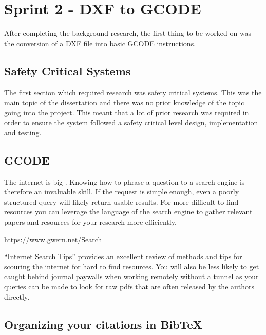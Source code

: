 \chapter{Sprint 2 - DXF to GCODE}
	\label{chap:background}
		
	After completing the background research, the first thing to be worked on was the conversion of a DXF file into basic GCODE instructions.

	\section{Safety Critical Systems}
		The first section which required research was safety critical systems. This was the main topic of the dissertation and there was no prior knowledge of the topic going into the project. This meant that a lot of prior research was required in order to ensure the system followed a safety critical level design, implementation and testing.

	\section{GCODE}
		\label{sec:google_fu}
		The internet is big \cite{sizeofinternet}. Knowing how to phrase a question to a search engine is therefore an invaluable skill. If the request is simple enough, even a poorly structured query will likely return usable results. For more difficult to find resources you can leverage the language of the search engine to gather relevant papers and resources for your research more efficiently. 
		
		\begin{center}
		{\small \url{https://www.gwern.net/Search}}
		\end{center}
		
		``Internet Search Tips'' \cite{gwern} provides an excellent review of methods and tips for scouring the internet for hard to find resources. You will also be less likely to get caught behind journal paywalls when working remotely without a tunnel as your queries can be made to look for raw pdfs that are often released by the authors directly.
			
	\section{Organizing your citations in BibTeX}       
		\label{sec:resources_bibtex}
	
